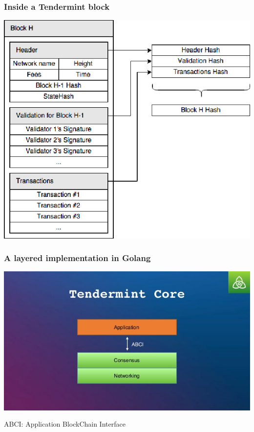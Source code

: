 \documentclass[11pt]{beamer}  %
\begin{document}
\begin{frame}\frametitle{Inside a Tendermint block}

  \begin{center}
    \includegraphics[scale=.38,clip=false]{pictures/tendermint-block.png}
  \end{center}

\end{frame}

\begin{frame}\frametitle{A layered implementation in Golang}

  \begin{center}
    \includegraphics[scale=.38,clip=false]{pictures/tendermint-core.jpg}
  \end{center}

  \begin{center}
    ABCI: Application BlockChain Interface
  \end{center}

\end{frame}
\end{document}
